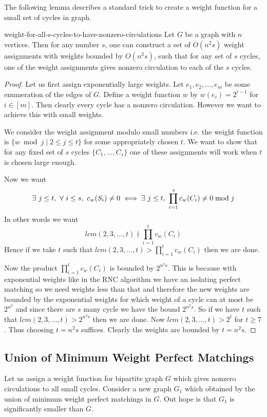 The following lemma describes a standard trick to create a weight function for a small set of cycles in graph.
\begin{lemma}{\cite{ChariRohatgiSrinivasan_1993_Rou_CONF}}{weight-for-all-s-cycles-to-have-nonzero-circulations}
	Let $G$ be a graph with $n$ vertices. Then for any number $s$, one can construct a set of $O(n^2s)$ weight assignments with weights bounded by $O(n^2s)$, such that for any set of $s$ cycles, one of the weight assignments gives nonzero circulation to each of the $s$ cycles.
\end{lemma}
\begin{proof}
	Let us first assign exponentially large weights. Let $e_1, e_2,\dots , e_m$ be some enumeration of the edges of $G$. Define  a weight function $w$ by $w(e_i)=2^{i-1}$ for $i\in [m]$. Then clearly every cycle has a nonzero circulation. However we want to achieve this with small weights.
	
We consider the weight assignment modulo small numbers i.e. the weight function is $\{w\bmod j\mid 2\leq j\leq t\}$ for some appropriately chosen $t$. We want to show that for any fixed set of $s$ cycles $\{C_1,\dots, C_s\}$ one of these assignments will work when $t$ is chosen large enough. 
	
	Now we want $$\exs\ j\leq t,\ \forall\ i\leq s,\ c_w(S_i)\neq 0\iff \exs\ j\leq t,\ \prod_{i=1}^s c_w(C_i)\neq 0\bmod j$$In other words we want $$lcm(2,3,\dots, t)\nmid \prod_{i=1}^t c_w(C_i)$$Hence if we take $t$ such that $lcm(2,3,\dots, t)> \prod\limits_{i=1}^t c_w(C_i)$ then we are done. 
	
	Now the product $\prod\limits_{i=1}^t c_w(C_i)$ is bounded by $2^{n^2s}$. This is because with exponential weights {like in the RNC algorithm} we have an isolating perfect matching so we need weights less than that and therefore the new weights are bounded by the exponential weights for which weight of a cycle can at most be $2^{n^2}$ and since there are $s$ many cycle we have the bound $2^{n^2s}$. So if we have $t$ such that $lcm(2,3,\dots, t)>2^{n^2s}$ then we are done. Now $lcm(2,3,\dots,t)>2^t$ for $t\geq 7$. Thus choosing $t=n^2s$ suffices. Clearly the weights are bounded by $t=n^2s$.
\end{proof}

\subsection{Union of Minimum Weight Perfect Matchings}
Let us assign a weight function for bipartite graph $G$ which gives nonzero circulations to all small cycles. Consider a new graph $G_1$ which obtained by the union of minimum weight perfect matchings in $G$. Out hope is that $G_1$ is significantly smaller than $G$.

